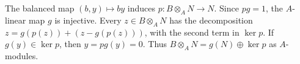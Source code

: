 The balanced map $(b,y)\mapsto by$ induces $p:B\otimes_A N\to N$. Since $pg=1$, the $A$-linear map $g$ is injective. Every $z\in B\otimes_A N$ has the decomposition $z=g(p(z))+(z-g(p(z)))$, with the second term in $\ker p$. If $g(y)\in\ker p$, then $y=pg(y)=0$. Thus $B\otimes_A N=g(N)\oplus\ker p$ as $A$-modules.
